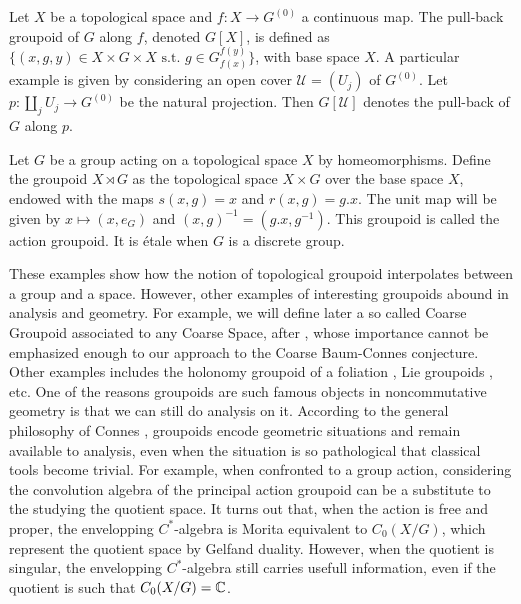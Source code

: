 \begin{Expl}
Let $X$ be a topological space and $f : X\rightarrow G^{(0)} $ a continuous map. The pull-back groupoid of $G$ along $f$, denoted $G[X]$, is defined as $\{(x,g,y)\in X\times G \times X \text{ s.t. }g\in G_{f(x)}^{f(y)}\}$, with base space $X$. A particular example is given by considering an open cover $\mathcal U=(U_j)$ of $G^{(0)}$. Let $p : \coprod_{j} U_j \rightarrow G^{(0)}$ be the natural projection. Then $G[\mathcal U]$ denotes the pull-back of $G$ along $p$.
\end{Expl}

\begin{Expl} Let $G$ be a group acting on a topological space $X$ by homeomorphisms. Define the groupoid $X\rtimes G$ as the topological space $X\times G$ over the base space $X$, endowed with the maps $s(x,g)=x$ and $r(x,g)=g.x$. The unit map will be given by $x\mapsto (x,e_G)$ and $(x,g)^{-1} = (g.x , g^{-1})$. This groupoid is called the action groupoid. It is étale when $G$ is a discrete group.  
\end{Expl}

These examples show how the notion of topological groupoid interpolates between a group and a space. However, other examples of interesting groupoids abound in analysis and geometry. For example, we will define later a so called Coarse Groupoid associated to any Coarse Space, after \cite{SkTuYu}, whose importance cannot be emphasized enough to our approach to the Coarse Baum-Connes conjecture.\\

Other examples includes the holonomy groupoid of a foliation \cite{connesfoliations}, Lie groupoids \cite{paterson}, etc. One of the reasons groupoids are such famous objects in noncommutative geometry is that we can still do analysis on it. According to the general philosophy of Connes \cite{Connes94}, groupoids encode geometric situations and remain available to analysis, even when the situation is so pathological that classical tools become trivial. For example, when confronted to a group action, considering the convolution algebra of the principal action groupoid can be a substitute to the studying the quotient space. It turns out that, when the action is free and proper, the envelopping $C^*$-algebra is Morita equivalent to $C_0(X/G)$, which represent the quotient space by Gelfand duality. However, when the quotient is %
singular, the envelopping $C^*$-algebra still carries usefull information, even if the quotient  is such that $C_0(X/G) = \mathbb C$.

